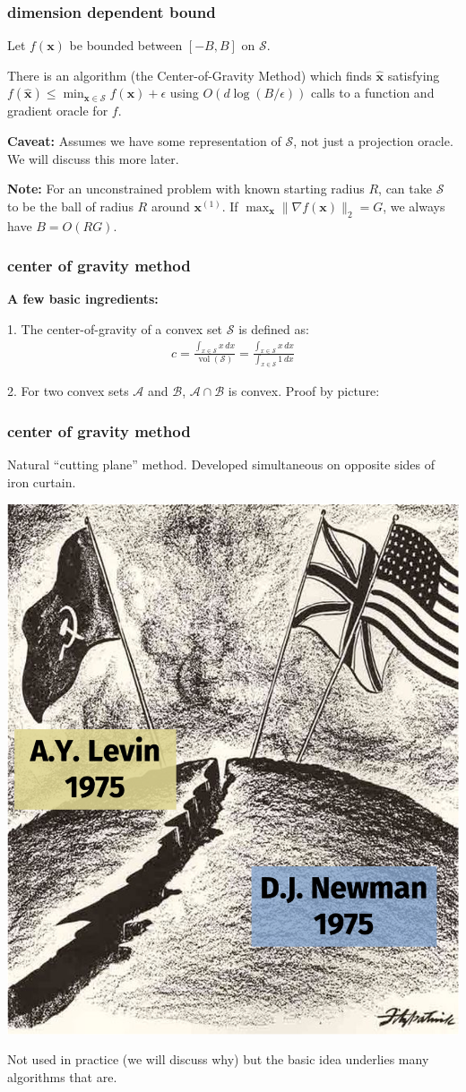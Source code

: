 \documentclass[compress]{beamer}
\newcommand{\bv}[1]{\mathbf{#1}}
\DeclareMathOperator{\vol}{vol}
\begin{document}
\begin{frame}[t]
	\frametitle{dimension dependent bound}	
	Let $f(\bv{x})$ be bounded between $[-B, B]$ on $\mathcal{S}$. 
	\begin{theorem}
		There is an algorithm (the Center-of-Gravity Method) which finds $\hat{\bv{x}}$ satisfying $f(\hat{\bv{x}}) \leq \min_{\bv{x}\in \mathcal{S}}f(\bv{x})+\epsilon$  using $O(d\log(B/\epsilon))$ calls to a function and gradient oracle for $f$.
	\end{theorem}
	\textbf{Caveat:} Assumes we have some representation of $\mathcal{S}$, not just a projection oracle. We will discuss this more later.
	
	\textbf{Note:} For an unconstrained problem with known starting radius $R$, can take $\mathcal{S}$ to be the ball of radius $R$ around $\bv{x}^{(1)}$. If $\max_{\bv{x}}\|\nabla f(\bv{x})\|_2 = G$, we always have $B = O(R G)$. 
	
\end{frame}

\begin{frame}[t]
	\frametitle{center of gravity method}
	\textbf{A few basic ingredients:}

	1. The center-of-gravity of a convex set $\mathcal{S}$ is defined as:
	\begin{align*}
		c = \frac{\int_{x\in \mathcal{S}} x\, dx}{\vol(\mathcal{S})} =  \frac{\int_{x\in \mathcal{S}} x\, dx}{\int_{x\in \mathcal{S}} 1\, dx}
	\end{align*}

	2. For two convex sets $\mathcal{A}$ and $\mathcal{B}$, $\mathcal{A}\cap \mathcal{B}$ is convex. Proof by picture:
\end{frame}

\begin{frame}[t]
	\frametitle{center of gravity method}
	\begin{center}
		Natural ``cutting plane'' method. Developed simultaneous on opposite sides of iron curtain.
	\end{center}
\begin{center}
	\includegraphics[width=.4\textwidth]{cog_proof.png}
\end{center}

\vspace{-.5em}
Not used in practice (we will discuss why) but the basic idea underlies many algorithms that are. 
\end{frame}
\end{document}
